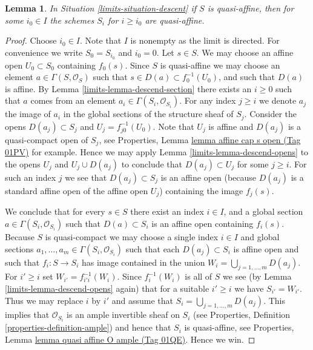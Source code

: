 \documentclass{amsart}
\theoremstyle{plain}
\newtheorem{lemma}[subsection]{Lemma}
\theoremstyle{definition}
\theoremstyle{remark}
\numberwithin{equation}{subsection}
\begin{document}
\begin{lemma}
\label{limits-lemma-limit-quasi-affine}
In Situation \ref{limits-situation-descent} if $S$ is quasi-affine, then
for some $i_0 \in I$ the schemes $S_i$ for $i \geq i_0$ are quasi-affine.
\end{lemma}

\begin{proof}
Choose $i_0 \in I$. Note that $I$ is nonempty as the limit is directed.
For convenience we write $S_0 = S_{i_0}$ and $i_0 = 0$.
Let $s \in S$. We may choose an affine open
$U_0 \subset S_0$ containing $f_0(s)$. Since $S$ is quasi-affine
we may choose an element $a \in \Gamma(S, \mathcal{O}_S)$ such
that $s \in D(a) \subset f_0^{-1}(U_0)$, and such that
$D(a)$ is affine. By Lemma \ref{limits-lemma-descend-section}
there exists an $i \geq 0$ such that $a$
comes from an element $a_i \in \Gamma(S_i, \mathcal{O}_{S_i})$.
For any index $j \geq i$ we denote $a_j$
the image of $a_i$ in the global sections of the
structure sheaf of $S_j$.
Consider the opens $D(a_j) \subset S_j$
and $U_j = f_{j0}^{-1}(U_0)$. Note that
$U_j$ is affine and $D(a_j)$ is a quasi-compact open of $S_j$,
see Properties, Lemma \href{https://stacks.math.columbia.edu/tag/01PV}{lemma affine cap s open (Tag 01PV)}
for example. Hence we may apply Lemma \ref{limits-lemma-descend-opens} to the opens
$U_j$ and $U_j \cup D(a_j)$ to conclude that
$D(a_j) \subset U_j$ for some  $j \geq i$.
For such an index $j$ we see that $D(a_j) \subset S_j$ is an affine open
(because $D(a_j)$ is a standard affine open of the affine open $U_j$)
containing the image $f_j(s)$.

\medskip\noindent
We conclude that for every $s \in S$ there exist
an index $i \in I$, and a global section
$a \in \Gamma(S_i, \mathcal{O}_{S_i})$
such that $D(a) \subset S_i$ is an affine open
containing $f_i(s)$. Because $S$ is quasi-compact we
may choose a single index $i \in I$ and global sections
$a_1, \ldots, a_m \in \Gamma(S_i, \mathcal{O}_{S_i})$
such that each $D(a_j) \subset S_i$ is affine open
and such that $f_i : S \to S_i$ has image contained
in the union $W_i = \bigcup_{j = 1, \ldots, m} D(a_j)$.
For $i' \geq i$ set $W_{i'} = f_{i'i}^{-1}(W_i)$.
Since $f_i^{-1}(W_i)$ is all of $S$ we see
(by Lemma \ref{limits-lemma-descend-opens} again)
that for a suitable $i' \geq i$ we
have $S_{i'} = W_{i'}$. Thus we may replace $i$ by
$i'$ and assume that $S_i = \bigcup_{j = 1, \ldots, m} D(a_j)$.
This implies that $\mathcal{O}_{S_i}$ is an ample invertible
sheaf on $S_i$ (see Properties, Definition \ref{properties-definition-ample})
and hence that $S_i$ is quasi-affine, see
Properties, Lemma \href{https://stacks.math.columbia.edu/tag/01QE}{lemma quasi affine O ample (Tag 01QE)}.
Hence we win.
\end{proof}
\end{document}
